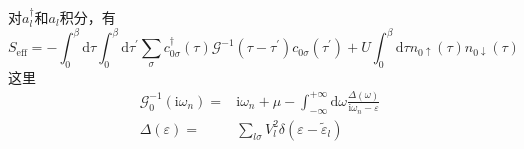 {{	对$a_l^{\dag}$和$a_l$积分，有
	\begin{displaymath}
		S_{\mathrm{eff}}=-\int_0^{\beta}\mathrm{d}\tau\int_0^{\beta}\mathrm{d}\tau^{\prime}\sum_{\sigma}c_{0\sigma}^{\dag}(\tau)\mathcal{G}^{-1}(\tau-\tau^{\prime})c_{0\sigma}(\tau^{\prime})+U\int_0^{\beta}\mathrm{d}\tau n_{0\uparrow}(\tau)n_{0\downarrow}(\tau)
	\end{displaymath}
这里
\begin{displaymath}
	\begin{aligned}
		\mathcal{G}_0^{-1}(\mathrm{i}\omega_n)=&\mathrm{i}\omega_n+\mu-\int_{-\infty}^{+\infty}\mathrm{d}\omega\frac{\Delta(\omega)}{\mathrm{i}\omega_n-\varepsilon}\\
		\Delta(\varepsilon)=&\sum_{l\sigma}V_l^2\delta(\varepsilon-\tilde{\varepsilon}_l)
	\end{aligned}
\end{displaymath}
}

}
